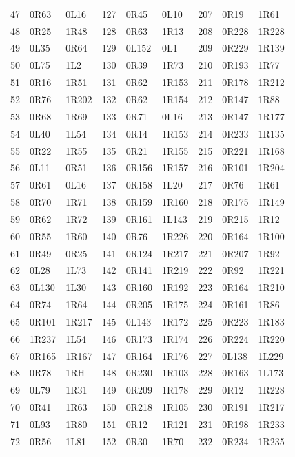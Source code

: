 \begin{longtable}{rll@{\hspace{1.3em}}rll@{\hspace{1.3em}}rll}
47 & 0R63 & 0L16 & 127 & 0R45 & 0L10 & 207 & 0R19 & 1R61\\
48 & 0R25 & 1R48 & 128 & 0R63 & 1R13 & 208 & 0R228 & 1R228\\
49 & 0L35 & 0R64 & 129 & 0L152 & 0L1 & 209 & 0R229 & 1R139\\
50 & 0L75 & 1L2 & 130 & 0R39 & 1R73 & 210 & 0R193 & 1R77\\
51 & 0R16 & 1R51 & 131 & 0R62 & 1R153 & 211 & 0R178 & 1R212\\
52 & 0R76 & 1R202 & 132 & 0R62 & 1R154 & 212 & 0R147 & 1R88\\
53 & 0R68 & 1R69 & 133 & 0R71 & 0L16 & 213 & 0R147 & 1R177\\
54 & 0L40 & 1L54 & 134 & 0R14 & 1R153 & 214 & 0R233 & 1R135\\
55 & 0R22 & 1R55 & 135 & 0R21 & 1R155 & 215 & 0R221 & 1R168\\
56 & 0L11 & 0R51 & 136 & 0R156 & 1R157 & 216 & 0R101 & 1R204\\
57 & 0R61 & 0L16 & 137 & 0R158 & 1L20 & 217 & 0R76 & 1R61\\
58 & 0R70 & 1R71 & 138 & 0R159 & 1R160 & 218 & 0R175 & 1R149\\
59 & 0R62 & 1R72 & 139 & 0R161 & 1L143 & 219 & 0R215 & 1R12\\
60 & 0R55 & 1R60 & 140 & 0R76 & 1R226 & 220 & 0R164 & 1R100\\
61 & 0R49 & 0R25 & 141 & 0R124 & 1R217 & 221 & 0R207 & 1R92\\
62 & 0L28 & 1L73 & 142 & 0R141 & 1R219 & 222 & 0R92 & 1R221\\
63 & 0L130 & 1L30 & 143 & 0R160 & 1R192 & 223 & 0R164 & 1R210\\
64 & 0R74 & 1R64 & 144 & 0R205 & 1R175 & 224 & 0R161 & 1R86\\
65 & 0R101 & 1R217 & 145 & 0L143 & 1R172 & 225 & 0R223 & 1R183\\
66 & 1R237 & 1L54 & 146 & 0R173 & 1R174 & 226 & 0R224 & 1R220\\
67 & 0R165 & 1R167 & 147 & 0R164 & 1R176 & 227 & 0L138 & 1L229\\
68 & 0R78 & 1RH & 148 & 0R230 & 1R103 & 228 & 0R163 & 1L173\\
69 & 0L79 & 1R31 & 149 & 0R209 & 1R178 & 229 & 0R12 & 1R228\\
70 & 0R41 & 1R63 & 150 & 0R218 & 1R105 & 230 & 0R191 & 1R217\\
71 & 0L93 & 1R80 & 151 & 0R12 & 1R121 & 231 & 0R198 & 1R233\\
72 & 0R56 & 1L81 & 152 & 0R30 & 1R70 & 232 & 0R234 & 1R235\\

\end{longtable}
